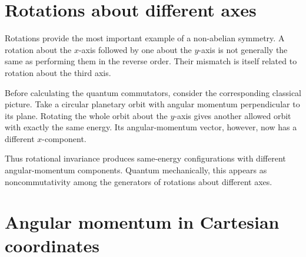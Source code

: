 \begin{classroomqa}
\end{classroomqa}

\section{Rotations about different axes}

Rotations provide the most important example of a non-abelian symmetry. A rotation about the \(x\)-axis followed by one about the \(y\)-axis is not generally the same as performing them in the reverse order. Their mismatch is itself related to rotation about the third axis.

\begin{classroomqa}
\end{classroomqa}

Before calculating the quantum commutators, consider the corresponding classical picture. Take a circular planetary orbit with angular momentum perpendicular to its plane. Rotating the whole orbit about the \(y\)-axis gives another allowed orbit with exactly the same energy. Its angular-momentum vector, however, now has a different \(x\)-component.

Thus rotational invariance produces same-energy configurations with different angular-momentum components. Quantum mechanically, this appears as noncommutativity among the generators of rotations about different axes.

\section{Angular momentum in Cartesian coordinates}

